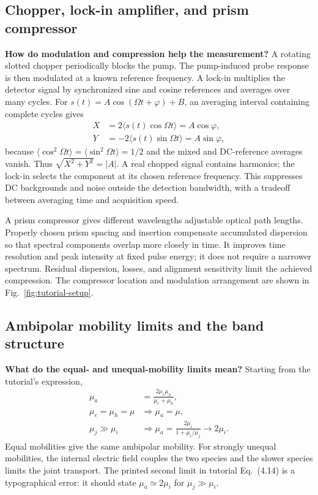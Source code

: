 \subsection{Chopper, lock-in amplifier, and prism compressor}
\textbf{How do modulation and compression help the measurement?}
A rotating slotted chopper periodically blocks the pump. The pump-induced probe response is then modulated at a known reference frequency. A lock-in multiplies the detector signal by synchronized sine and cosine references and averages over many cycles. For $s(t)=A\cos(\Omega t+\varphi)+B$, an averaging interval containing complete cycles gives
\begin{align}
X&=2\langle s(t)\cos\Omega t\rangle=A\cos\varphi,\\
Y&=-2\langle s(t)\sin\Omega t\rangle=A\sin\varphi,
\end{align}
because $\langle\cos^2\Omega t\rangle=\langle\sin^2\Omega t\rangle=1/2$ and the mixed and DC-reference averages vanish. Thus $\sqrt{X^2+Y^2}=|A|$. A real chopped signal contains harmonics; the lock-in selects the component at its chosen reference frequency. This suppresses DC backgrounds and noise outside the detection bandwidth, with a tradeoff between averaging time and acquisition speed.

A prism compressor gives different wavelengths adjustable optical path lengths. Properly chosen prism spacing and insertion compensate accumulated dispersion so that spectral components overlap more closely in time. It improves time resolution and peak intensity at fixed pulse energy; it does not require a narrower spectrum. Residual dispersion, losses, and alignment sensitivity limit the achieved compression. The compressor location and modulation arrangement are shown in Fig.~\ref{fig:tutorial-setup}.

\subsection{Ambipolar mobility limits and the band structure}
\textbf{What do the equal- and unequal-mobility limits mean?}
Starting from the tutorial's expression,
\begin{align}
\mu_a&=\frac{2\mu_e\mu_h}{\mu_e+\mu_h},\\
\mu_e=\mu_h=\mu&\Rightarrow \mu_a=\mu,\\
\mu_j\gg\mu_i&\Rightarrow
\mu_a=\frac{2\mu_i}{1+\mu_i/\mu_j}\longrightarrow2\mu_i.
\end{align}
Equal mobilities give the same ambipolar mobility. For strongly unequal mobilities, the internal electric field couples the two species and the slower species limits the joint transport. The printed second limit in tutorial Eq.~(4.14) is a typographical error: it should state $\mu_a\simeq2\mu_i$ for $\mu_j\gg\mu_i$.


